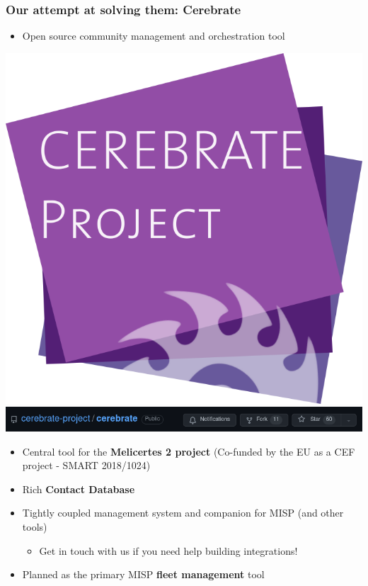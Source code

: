 \begin{frame}
\frametitle{Our attempt at solving them: Cerebrate}
    \begin{itemize}
        \item Open source community management and orchestration tool
    \end{itemize}
    \begin{center}
        \includegraphics[width=0.15\linewidth]{pictures/logo.png}
        \linebreak
        \includegraphics[width=0.99\linewidth]{pictures/cerebrate-github.png}
    \end{center}
    \begin{itemize}
        \item Central tool for the \textbf{Melicertes 2 project} (Co-funded by the EU as a CEF project - SMART 2018/1024)
        \item Rich \textbf{Contact Database}
        \item Tightly coupled management system and companion for MISP (and other tools)
        \begin{itemize}
            \item Get in touch with us if you need help building integrations!
        \end{itemize}
        \item Planned as the primary MISP \textbf{fleet management} tool
    \end{itemize}
\end{frame}

